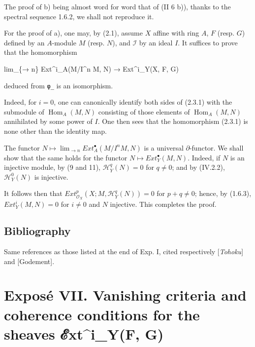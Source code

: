 \documentclass[
  11pt,
  a4paper,
]{book}
\newenvironment{Shaded}{}{}
\newcommand{\NormalTok}[1]{#1}
\newcounter{none} %
\begin{document}
The proof of b) being almost word for word that of (II 6 b)), thanks to
the spectral sequence 1.6.2, we shall not reproduce it.

For the proof of a), one may, by (2.1), assume \(X\) affine with ring
\(A\), \(F\) (resp. \(G\)) defined by an \(A\)-module \(M\) (resp.
\(N\)), and \(\mathcal{I}\) by an ideal \(I\). It suffices to prove that
the homomorphism

\begin{Shaded}
\begin{Highlighting}[]
\NormalTok{lim\_\{→ n\} Ext\^{}i\_A(M/I\^{}n M, N) → Ext\^{}i\_Y(X, F, G)}
\end{Highlighting}
\end{Shaded}

deduced from \texttt{φ̲} is an isomorphism.

Indeed, for \(i = 0\), one can canonically identify both sides of
(2.3.1) with the submodule of \(\operatorname{Hom}_{A}(M,
N)\) consisting of those elements of \(\operatorname{Hom}_{A}(M, N)\)
annihilated by some power of \(I\). One then sees that the homomorphism
(2.3.1) is none other than the identity map.

The functor \(N \mapsto \lim_{\to n} Ext^{\bullet}_{A}(M/I^{n} M, N)\)
is a universal \(\partial\)-functor. We shall show that the same holds
for the functor \(N \mapsto Ext^{\bullet}_{Y}(M, N)\). Indeed, if \(N\)
is an injective module, by (9 and 11), \(\mathcal{H}^{q}_{Y}(N) = 0\)
for \(q \neq 0\); and by (IV.2.2), \(\mathcal{H}^{0}_{Y}(N)\) is
injective.

It follows then that
\(Ext^{p}_{\mathcal{O}_{X}}(X; M, \mathcal{H}^{q}_{Y}(N)) = 0\) for
\(p + q \neq 0\); hence, by (1.6.3), \(Ext^{i}_{Y}(M, N) = 0\) for
\(i \neq 0\) and \(N\) injective. This completes the proof.

\section{Bibliography}\label{bibliography-1}

Same references as those listed at the end of Exp. I, cited respectively
{[}\emph{Tohoku}{]} and {[}Godement{]}.

\chapter{Exposé VII. Vanishing criteria and coherence conditions for the
sheaves ℰxt\^{}i\_Y(F,
G)}\label{exposuxe9-vii.-vanishing-criteria-and-coherence-conditions-for-the-sheaves-ux2130xti_yf-g}
\end{document}
